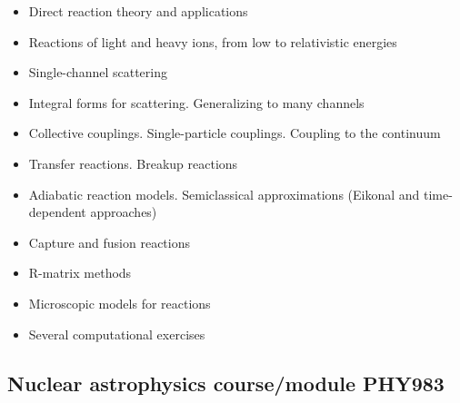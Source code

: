 \documentclass[%
twoside,                 %
final,                   %
10pt]{article}
\begin{document}
\begin{itemize}
\item Direct reaction theory and applications

\item Reactions of light and heavy ions, from low to relativistic energies

\item Single-channel scattering

\item Integral forms for scattering. Generalizing to many channels

\item Collective couplings. Single-particle couplings. Coupling to the continuum

\item Transfer reactions. Breakup reactions

\item Adiabatic reaction models. Semiclassical approximations (Eikonal and time-dependent approaches)

\item Capture and fusion reactions

\item R-matrix methods

\item Microscopic models for reactions

\item Several computational exercises
\end{itemize}

\noindent



\subsection*{Nuclear astrophysics course/module PHY983}

\end{document}
